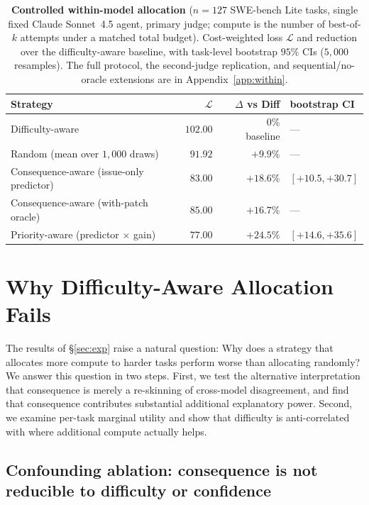 \documentclass{article}
\begin{document}
\begin{table}[t]
\centering
\caption{\textbf{Controlled within-model allocation} ($n{=}127$
SWE-bench Lite tasks, single fixed Claude Sonnet~4.5 agent, primary
judge; compute is the number of best-of-$k$ attempts under a matched
total budget). Cost-weighted loss $\mathcal{L}$ and reduction over the
difficulty-aware baseline, with task-level bootstrap $95\%$ CIs
($5{,}000$ resamples). The full protocol, the second-judge replication,
and sequential/no-oracle extensions are in Appendix~\ref{app:within}.}
\label{tab:withinmain}
\small
\begin{tabular}{lrrl}
\toprule
Strategy & $\mathcal{L}$ & $\Delta$ vs Diff & bootstrap CI \\
\midrule
Difficulty-aware                         & $102.00$ & ~~$0\%$ baseline & --- \\
Random (mean over $1{,}000$ draws)        & $91.92$  & $+9.9\%$ & --- \\
Consequence-aware (issue-only predictor)  & $83.00$  & $+18.6\%$ & $[+10.5, +30.7]$ \\
Consequence-aware (with-patch oracle)     & $85.00$  & $+16.7\%$ & --- \\
Priority-aware (predictor $\times$ gain)  & $\mathbf{77.00}$ & $\mathbf{+24.5\%}$ & $[+14.6, +35.6]$ \\
\bottomrule
\end{tabular}
\end{table}

\section{Why Difficulty-Aware Allocation Fails}
\label{sec:whyfail}

The results of \S\ref{sec:exp} raise a natural question: Why does a
strategy that allocates more compute to harder tasks perform worse than
allocating randomly? We answer this question in two steps. First, we test the alternative interpretation that consequence is merely a re-skinning of cross-model disagreement, and find that consequence contributes substantial additional explanatory power. Second, we
examine per-task marginal utility and show that difficulty is
anti-correlated with where additional compute actually helps.

\subsection{Confounding ablation: consequence is not reducible to difficulty or confidence}
\label{sec:p0b}
\end{document}

